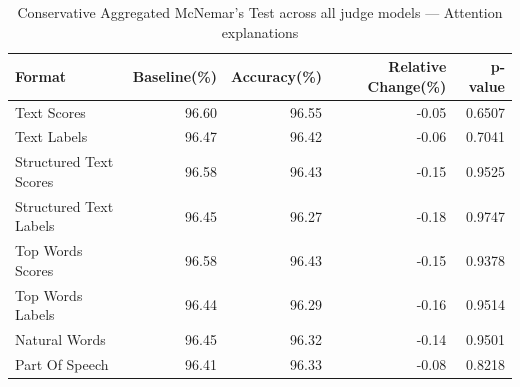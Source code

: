 \begin{table}[htbp]
\centering
\small
\caption{Conservative Aggregated McNemar's Test across all judge models --- Attention explanations}
\label{tab:conservative-aggregated-attention-all-models}
\begin{tabular}{lrrrr}
\toprule
Format & Baseline(\%) & Accuracy(\%) & Relative Change(\%) & p-value \\
\midrule
Text Scores & 96.60 & 96.55 & -0.05 & 0.6507 \\
Text Labels & 96.47 & 96.42 & -0.06 & 0.7041 \\
Structured Text Scores & 96.58 & 96.43 & -0.15 & 0.9525 \\
Structured Text Labels & 96.45 & 96.27 & -0.18 & 0.9747 \\
Top Words Scores & 96.58 & 96.43 & -0.15 & 0.9378 \\
Top Words Labels & 96.44 & 96.29 & -0.16 & 0.9514 \\
Natural Words & 96.45 & 96.32 & -0.14 & 0.9501 \\
Part Of Speech & 96.41 & 96.33 & -0.08 & 0.8218 \\
\bottomrule
\end{tabular}
\end{table}